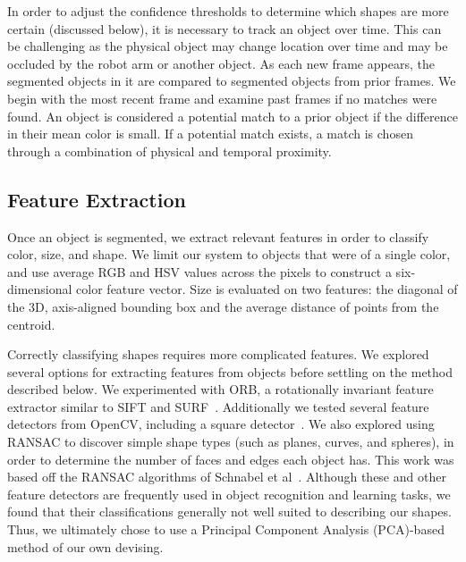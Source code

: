 \documentclass[11pt]{article}
\begin{document}
In order to adjust the confidence thresholds to determine which shapes are more
certain (discussed below), it is necessary to track an object over time. This can
be challenging as the physical object may change location over time and may be
occluded by the robot arm or another object. As each new frame appears, the
segmented objects in it are compared to segmented objects from prior frames.
We begin with the most recent frame and examine past frames if no matches were
found.  An object is considered a potential match to a prior object if the difference
in their mean color is small. If a potential match exists, a match is chosen
through a combination of physical and temporal proximity.

\subsection{Feature Extraction}
Once an object is segmented, we extract relevant features in order to classify
color, size, and shape. We limit our system to objects that were of a single color,
and use average RGB and HSV values across the pixels to construct a
six-dimensional color feature vector. Size is evaluated on two features: the
diagonal of the 3D, axis-aligned bounding box and the average distance of
points from the centroid.

Correctly classifying shapes requires more complicated features.
We explored several options for extracting features from
objects before settling on the method described below. We experimented
with ORB, a rotationally invariant feature extractor similar to SIFT and
SURF~\cite{rublee2011orb}. Additionally we tested several feature detectors
from OpenCV, including a square detector~\cite{opencv_library}. We also explored
using RANSAC to discover simple shape types (such as planes, curves, and spheres),
in order to determine the number of faces and edges each object has. This work
was based off the RANSAC algorithms of Schnabel et al~\cite{schnabel2007efficient}.
Although these and other feature detectors are frequently used in object recognition
and learning tasks, we found that their classifications generally not well
suited to describing our shapes. Thus, we ultimately chose to use a Principal Component Analysis
(PCA)-based method of our own devising.
\end{document}
